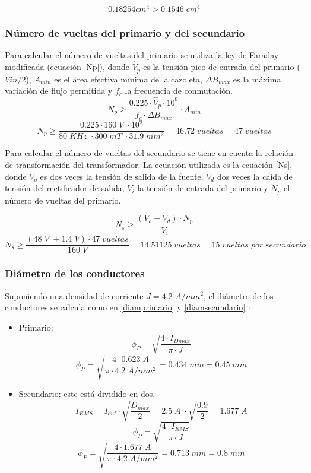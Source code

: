 \documentclass[11pt, a4paper]{article}
\begin{document}
\[ 0.18254 cm^4 > 0.1546 \; cm^4 \]

\subsubsection{Número de vueltas del primario y del secundario}
Para calcular el número de vueltas del primario se utiliza la ley de Faraday modificada (ecuación \ref{Np}), donde $\hat{V}_p$ es la tensión pico de entrada del primario ($Vin/2$), $A_{min}$ es el área efectiva mínima de la cazoleta, $\Delta B_{max}$ es la máxima variación de flujo permitida y $f_c$ la frecuencia de conmutación.
\begin{equation}
	N_p \geq \frac{0.225 \cdot \hat{V}_p \cdot 10^9}{f_c \cdot \Delta B_{max}} \cdot A_{min} 
	\label{Np}
\end{equation}
\[ N_p \geq \frac{0.225 \cdot 160 \; V \; \cdot 10^9}{80 \; KHz \; \cdot 300 \; mT \; \cdot 31.9 \; mm^2} = 46.72 \; vueltas = 47 \; vueltas \]

Para calcular el número de vueltas del secundario se tiene en cuenta la relación de transformación del transformador. La ecuación utilizada es la ecuación \ref{Ns}, donde $V_o$ es dos veces la tensión de salida de la fuente, $V_d$ dos veces la caída de tensión del rectificador de salida, $V_i$ la tensión de entrada del primario y $N_p$ el número de vueltas del primario.

\begin{equation}
	N_s \geq \frac{(V_o + V_d) \cdot N_p}{V_i}
	\label{Ns}
\end{equation}
\[ N_s \geq \frac{(48 \; V \; + 1.4 \; V) \cdot 47 \; vueltas}{160 \; V} = 14.51125 \; vueltas = 15 \; vueltas \; por \; secundario \]

\subsubsection{Diámetro de los conductores}
Suponiendo una densidad de corriente $J = 4.2$ $A/mm^2$, el diámetro de los conductores se calcula como en \ref{diamprimario} y \ref{diamsecundario} :
\begin{itemize}
	\item Primario:
		\begin{equation}
		\phi_P = \sqrt{\frac{4 \cdot I_{Dmax}}{\pi \cdot J}}
		\label{diamprimario}
		\end{equation}
		\[ \phi_P = \sqrt{\frac{4 \cdot 0.623 \; A}{\pi \cdot 4.2 \; A/mm^2}} = 0.434 \; mm = 0.45 \; mm \]
	\item Secundario: este está dividido en dos.
		\[ I_{RMS} = I_{out} \cdot \sqrt{\frac{D_{max}}{2}} = 2.5 \; A \; \cdot \sqrt{\frac{0.9}{2}} = 1.677 \; A \]
		\begin{equation}
		\phi_P = \sqrt{\frac{4 \cdot I_{RMS}}{\pi \cdot J}}
		\label{diamsecundario}
		\end{equation}
		\[ \phi_P = \sqrt{\frac{4 \cdot 1.677 \; A}{\pi \cdot 4.2 \; A/mm^2}} = 0.713 \; mm = 0.8 \; mm \]
\end{itemize}
\end{document}
